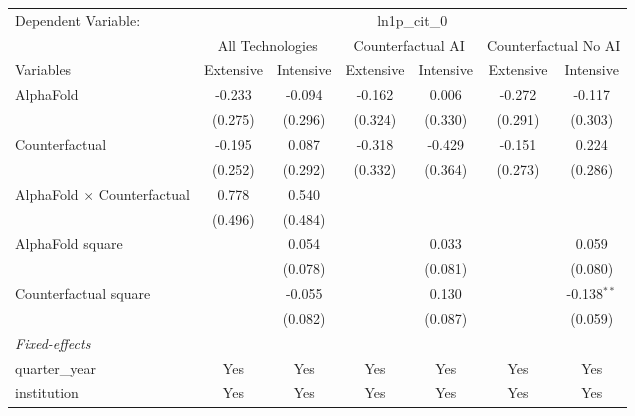 \begingroup
\centering
\begin{tabular}{lcccccc}
   \tabularnewline \midrule \midrule
   Dependent Variable: & \multicolumn{6}{c}{ln1p\_cit\_0}\\
 & \multicolumn{2}{c}{All Technologies} & \multicolumn{2}{c}{Counterfactual AI} & \multicolumn{2}{c}{Counterfactual No AI} \\
\cmidrule(lr){1-1}\cmidrule(lr){2-3} \cmidrule(lr){4-5} \cmidrule(lr){6-7}
Variables & \multicolumn{1}{c}{Extensive} & \multicolumn{1}{c}{Intensive} & \multicolumn{1}{c}{Extensive} & \multicolumn{1}{c}{Intensive} & \multicolumn{1}{c}{Extensive} & \multicolumn{1}{c}{Intensive} \\
\cmidrule(lr){1-1}\cmidrule(lr){2-2} \cmidrule(lr){3-3} \cmidrule(lr){4-4} \cmidrule(lr){5-5} \cmidrule(lr){6-6} \cmidrule(lr){7-7}
   AlphaFold                          & -0.233  & -0.094  & -0.162  & 0.006   & -0.272  & -0.117\\   
                                      & (0.275) & (0.296) & (0.324) & (0.330) & (0.291) & (0.303)\\   
   Counterfactual                     & -0.195  & 0.087   & -0.318  & -0.429  & -0.151  & 0.224\\   
                                      & (0.252) & (0.292) & (0.332) & (0.364) & (0.273) & (0.286)\\   
   AlphaFold $\times$ Counterfactual  & 0.778   & 0.540   &         &         &         &   \\   
                                      & (0.496) & (0.484) &         &         &         &   \\   
   AlphaFold square                   &         & 0.054   &         & 0.033   &         & 0.059\\   
                                      &         & (0.078) &         & (0.081) &         & (0.080)\\   
   Counterfactual square              &         & -0.055  &         & 0.130   &         & -0.138$^{**}$\\   
                                      &         & (0.082) &         & (0.087) &         & (0.059)\\   
   \midrule
   \emph{Fixed-effects}\\
   quarter\_year                      & Yes     & Yes     & Yes     & Yes     & Yes     & Yes\\  
   institution                        & Yes     & Yes     & Yes     & Yes     & Yes     & Yes\\  

\end{tabular}
